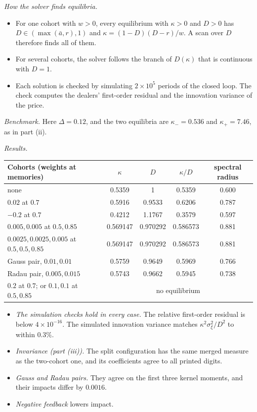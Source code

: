 \documentclass[12pt]{article}
\theoremstyle{definition}
\theoremstyle{remark}
\begin{document}
\emph{How the solver finds equilibria.}
\begin{itemize}[itemsep=1pt,topsep=2pt]
\item For one cohort with $w>0$, every equilibrium with $\kappa>0$ and $D>0$ has $D\in(\max(\bar a,r),1)$ and $\kappa=(1-D)(D-r)/w$. A scan over $D$ therefore finds all of them.
\item For several cohorts, the solver follows the branch of $D(\kappa)$ that is continuous with $D=1$.
\item Each solution is checked by simulating $2\times10^5$ periods of the closed loop. The check computes the dealers' first-order residual and the innovation variance of the price.
\end{itemize}

\emph{Benchmark.} Here $\Delta=0.12$, and the two equilibria are $\kappa_-=0.536$ and $\kappa_+=7.46$, as in part (ii).

\emph{Results.}
\begin{center}\small
\begin{tabular}{lcccc}
\hline
Cohorts (weights at memories) & $\kappa$ & $D$ & $\kappa/D$ & spectral radius\\
\hline
none & 0.5359 & 1 & 0.5359 & 0.600\\
$0.02$ at $0.7$ & 0.5916 & 0.9533 & 0.6206 & 0.787\\
$-0.2$ at $0.7$ & 0.4212 & 1.1767 & 0.3579 & 0.597\\
$0.005,0.005$ at $0.5,0.85$ & 0.569147 & 0.970292 & 0.586573 & 0.881\\
$0.0025,0.0025,0.005$ at $0.5,0.5,0.85$ & 0.569147 & 0.970292 & 0.586573 & 0.881\\
Gauss pair, $0.01,0.01$ & 0.5759 & 0.9649 & 0.5969 & 0.766\\
Radau pair, $0.005,0.015$ & 0.5743 & 0.9662 & 0.5945 & 0.738\\
$0.2$ at $0.7$; or $0.1,0.1$ at $0.5,0.85$ & \multicolumn{4}{c}{no equilibrium}\\
\hline
\end{tabular}
\end{center}
\begin{itemize}[itemsep=1pt,topsep=2pt]
\item \emph{The simulation checks hold in every case.} The relative first-order residual is below $4\times10^{-16}$. The simulated innovation variance matches $\kappa^2\sigma_\xi^2/D^2$ to within $0.3\%$.
\item \emph{Invariance (part (iii)).} The split configuration has the same merged measure as the two-cohort one, and its coefficients agree to all printed digits.
\item \emph{Gauss and Radau pairs.} They agree on the first three kernel moments, and their impacts differ by $0.0016$.
\item \emph{Negative feedback} lowers impact.
\end{itemize}
\end{document}
